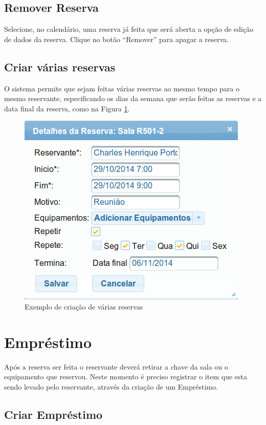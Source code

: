 \documentclass[openany,10pt,a4paper]{book}
\begin{document}
\subsection{Remover Reserva}
Selecione, no calendário, uma reserva já feita que será aberta a opção de edição de dados da reserva. Clique no botão ``Remover'' para apagar a reserva.

\subsection{Criar várias reservas}
O sistema permite que sejam feitas várias reservas ao mesmo tempo para o mesmo reservante, especificando os dias da semana que serão feitas as reservas e a data final da reserva, como na Figura \ref{im_variasReservas}.

\begin{figure}[!htb]
    \centering
    \includegraphics[scale=0.5]{variasReservas.png}
    \caption{Exemplo de criação de várias reservas}
    \label{im_variasReservas}
\end{figure}

\section{Empréstimo}

Após a reserva ser feita o reservante deverá retirar a chave da sala ou o equipamento que reservou. Neste momento é preciso registrar o item que esta sendo levado pelo reservante, através da criação de um Empréstimo.

\subsection{Criar Empréstimo}
\end{document}
